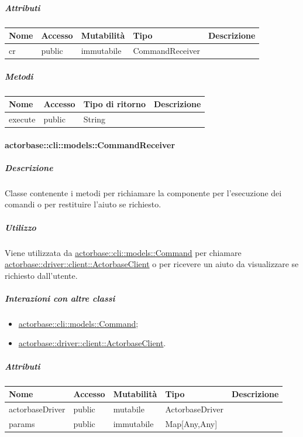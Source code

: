 \documentclass{scalatekids-article}
\begin{document}
\subparagraph{Attributi}

\begin{tabular}{| l | l | l | l | l |}
	\hline
	Nome & Accesso & Mutabilità & Tipo & Descrizione\\
	\hline
	cr & public & immutabile & CommandReceiver & \\
	\hline
\end{tabular}

\subparagraph{Metodi}

\begin{tabular}{| l | l | l | l |}
	\hline
	Nome & Accesso & Tipo di ritorno & Descrizione\\
	\hline
	execute & public & String & \\
	\hline
\end{tabular}

\paragraph{actorbase::cli::models::CommandReceiver}
\label{sec:actorbase::cli::models::CommandReceiver}

\subparagraph{Descrizione}

Classe contenente i metodi per richiamare la componente  per
l'esecuzione dei comandi o per restituire l'aiuto se richiesto.

\subparagraph{Utilizzo}

Viene utilizzata da \hyperref[sec:actorbase::cli::models::Command]{actorbase::cli::models::Command} per chiamare
\hyperref[sec:actorbase::driver::client::ActorbaseClient]{actorbase::driver::client::ActorbaseClient} o per ricevere un aiuto da
visualizzare se richiesto dall'utente.

\subparagraph{Interazioni con altre classi}

\begin{itemize}
\item \hyperref[sec:actorbase::cli::models::Command]{actorbase::cli::models::Command};
\item \hyperref[sec:actorbase::driver::client::ActorbaseClient]{actorbase::driver::client::ActorbaseClient}.
\end{itemize}

\subparagraph{Attributi}

\begin{tabular}{| l | l | l | l | l |}
	\hline
	Nome & Accesso & Mutabilità & Tipo & Descrizione\\
	\hline
	actorbaseDriver & public & mutabile & ActorbaseDriver & \\
	\hline
	params & public & immutabile & Map[Any,Any] & \\
	\hline
\end{tabular}
\end{document}
